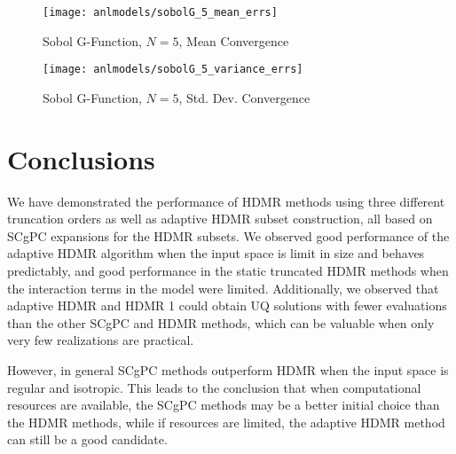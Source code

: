 \begin{figure}[H]
  \centering
  \texttt{[image: anlmodels/sobolG\_5\_mean\_errs]}
  \caption{Sobol G-Function, $N=5$, Mean Convergence}
  \label{fig:hdmr sobolG mean errors 5}
\end{figure}
\begin{figure}[H]
  \centering
  \texttt{[image: anlmodels/sobolG\_5\_variance\_errs]}
  \caption{Sobol G-Function, $N=5$, Std. Dev. Convergence}
  \label{fig:hdmr sobolG var errors 5}
\end{figure}


\section{Conclusions}
We have demonstrated the performance of HDMR methods using three different truncation orders as well as
adaptive HDMR subset construction, all based on SCgPC expansions for the HDMR subsets.  We observed good
performance of the adaptive HDMR algorithm when the input space is limit in size and behaves predictably, and
good performance in the static truncated HDMR methods when the interaction terms in the model were limited.
Additionally, we observed that adaptive HDMR and HDMR 1 could obtain UQ solutions with fewer evaluations than
the other SCgPC and HDMR methods, which can be valuable when only very few realizations are practical.

However, in general SCgPC methods outperform HDMR when the input space is regular and isotropic.  This leads
to the conclusion that when computational resources are available, the SCgPC methods may be a better initial choice
than the HDMR methods, while if resources are limited, the adaptive HDMR method can still be a good candidate.
